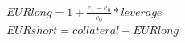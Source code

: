 \begin{align*} \label{payout_formula}
    EURlong =  1 + \frac{e_1 - e_0}{e_0} * leverage  \\
    EURshort =  collateral - EURlong
\end{align*}
